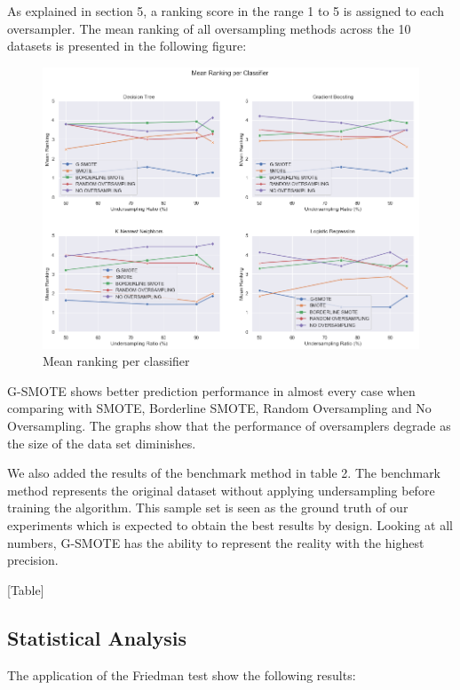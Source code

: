 \documentclass[parskip=full]{scrartcl}
\begin{document}
As explained in section 5, a ranking score in the range 1 to 5 is assigned to 
each oversampler. The mean ranking of all oversampling methods across the 10 
datasets is presented in the following figure: 

\begin{figure}[H]
	\centering
	\includegraphics[width=1\linewidth]{./resources/mean_ranking_per_classifier}
	\caption{Mean ranking per classifier}
	\label{fig:mean_ranking_per_classifier}
\end{figure}

G-SMOTE shows better prediction performance in almost every case when comparing 
with SMOTE, Borderline SMOTE, Random Oversampling and No Oversampling. The 
graphs show that the performance of oversamplers degrade as the size of the 
data set diminishes.  

We also added the results of the benchmark method in table 2. The benchmark 
method represents the original dataset without applying undersampling before 
training the algorithm. This sample set is seen as the ground truth of our 
experiments which is expected to obtain the best results by design. Looking at 
all numbers, G-SMOTE has the ability to represent the reality with the highest 
precision.

[Table]

\subsection{Statistical Analysis}

The application of the Friedman test show the following results:
\end{document}
